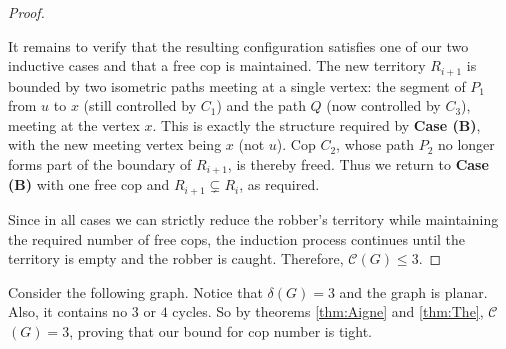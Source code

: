\documentclass[12pt, a4paper]{article}
\begin{document}
\begin{proof}
\begin{itemize}
    It remains to verify that the resulting configuration satisfies one of our two
    inductive cases and that a free cop is maintained. The new territory $R_{i+1}$ is
    bounded by two isometric paths meeting at a single vertex: the segment of $P_1$
    from $u$ to $x$ (still controlled by $C_1$) and the path $Q$ (now controlled by
    $C_3$), meeting at the vertex $x$. This is exactly the structure required by
    \textbf{Case (B)}, with the new meeting vertex being $x$ (not $u$). Cop $C_2$, whose
    path $P_2$ no longer forms part of the boundary of $R_{i+1}$, is thereby freed.
    Thus we return to \textbf{Case (B)} with one free cop and $R_{i+1} \subsetneq R_i$, as
    required.
\end{itemize}
Since in all cases we can strictly reduce the robber's territory while maintaining the required number of free cops, the induction process continues until the territory is empty and the robber is caught. Therefore, $\mathcal{C}(G) \leq 3$.
\end{proof}

\begin{example}{}{}
Consider the following graph. Notice that $\delta(G) = 3$ and the graph is planar. Also, it contains no $3$ or $4$ cycles. So by theorems \ref{thm:Aigne} and \ref{thm:The}, $\mathcal{C}$$(G) = 3$, proving that our bound for cop number is tight. 
\begin{center}
\end{center}
\end{example}
\newpage
\end{document}
